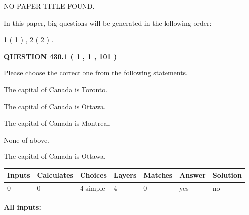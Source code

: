 \documentclass[12pt]{article}
\begin{document}
   
   
   
 NO PAPER TITLE FOUND.
   
   
   
\vspace{0.2in}
   
In this paper, big questions will be generated in the following order: 
   
   
   1 ( 1 )
 ,
   2 ( 2 )
 .
  
\vspace{0.2in}
  
{\textbf{\Large{QUESTION
430.1 
 ( 1 , 1 , 101 )
}}}
  
  
Please choose the correct one from the following statements.
 
 
The capital of Canada is Toronto.
 
 
The capital of Canada is Ottawa.
 
 
The capital of Canada is Montreal.
 
 
 None of above.
 
 
\noindent{}
 
 
The capital of Canada is Ottawa.
 
 
\noindent{}
 
 
   
   
   
   
\noindent\begin{tabular}{|l|l|l|l|l|l|l|}
 \hline
Inputs & Calculates & Choices & Layers & Matches & Answer & Solution \\ \hline
 0  & 
 0  & 
 4
  simple  
  & 
 4  & 
 0  & 
  yes & 
  no 
  \\ \hline
 \end{tabular}
   
   
   
   
\noindent{}
   
   
   
   
\noindent\vspace{0.1in}\hspace{-0.08in} {\textbf{\Large{All inputs: }}}
   
   
  
\end{document}
